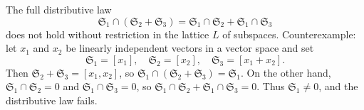 The full distributive law
$$
\mathfrak{S}_1 \cap (\mathfrak{S}_2 + \mathfrak{S}_3) = \mathfrak{S}_1 \cap \mathfrak{S}_2 + \mathfrak{S}_1 \cap \mathfrak{S}_3
$$
does not hold without restriction in the lattice $L$ of subspaces. Counterexample: let $x_1$ and $x_2$ be linearly independent vectors in a vector space and set
$$
\mathfrak{S}_1 = [x_1], \quad \mathfrak{S}_2 = [x_2], \quad \mathfrak{S}_3 = [x_1 + x_2].
$$
Then $\mathfrak{S}_2 + \mathfrak{S}_3 = [x_1, x_2]$, so $\mathfrak{S}_1 \cap (\mathfrak{S}_2 + \mathfrak{S}_3) = \mathfrak{S}_1$. On the other hand, $\mathfrak{S}_1 \cap \mathfrak{S}_2 = 0$ and $\mathfrak{S}_1 \cap \mathfrak{S}_3 = 0$, so $\mathfrak{S}_1 \cap \mathfrak{S}_2 + \mathfrak{S}_1 \cap \mathfrak{S}_3 = 0$. Thus $\mathfrak{S}_1 \neq 0$, and the distributive law fails.
